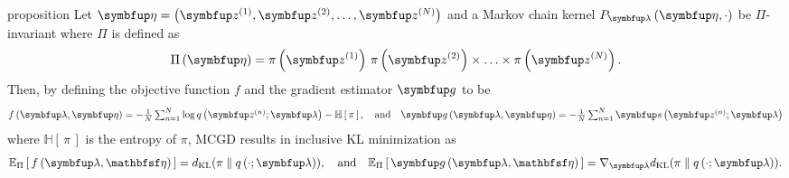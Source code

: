 
\begin{theoremEnd}{proposition}\label{thm:product_kernel}
  Let \(\veta = \left( \vz^{(1)}, \vz^{(2)}, \ldots, \vz^{(N)} \right)\) and a Markov chain kernel \(P_{\vlambda}\left(\veta, \cdot\right)\) be \(\Pi\)-invariant where \(\Pi\) is defined as
  {%
  \[
  \Pi\left(\veta\right) = \pi\left(\vz^{(1)}\right) \, \pi\left(\vz^{(2)}\right) \times \ldots \times \pi\left(\vz^{(N)}\right).
  \]
  }
  Then, by defining the objective function \(f\) and the gradient estimator \(\vg\) to be 
  {%
  \begin{align*}
    \textstyle
    f\left(\vlambda, \veta\right) =  -\frac{1}{N} \sum^{N}_{n=1} \log q\left(\vz^{(n)}; \vlambda\right) - \mathbb{H}\left[\,\pi\,\right], 
    \quad\text{and}\quad
    \vg\left(\vlambda, \veta\right) =  -\frac{1}{N} \sum^{N}_{n=1} \vs\left(\vz^{(n)}; \vlambda\right)
  \end{align*}
  }
  where \(\mathbb{H}\left[\,\pi\,\right]\) is the entropy of \(\pi\), MCGD results in inclusive KL minimization as
  {%
  \begin{align*}
    \Esub{\Pi}{ f\left(\vlambda, \rvveta\right) } = \DKL{\pi}{q\left(\cdot; \vlambda\right)},
    \quad\text{and}\quad
    \Esub{\Pi}{ \vg\left(\vlambda, \rvveta\right) } = \nabla_{\vlambda} \DKL{\pi}{q\left(\cdot; \vlambda\right)}.
  \end{align*}
  }
\end{theoremEnd}

